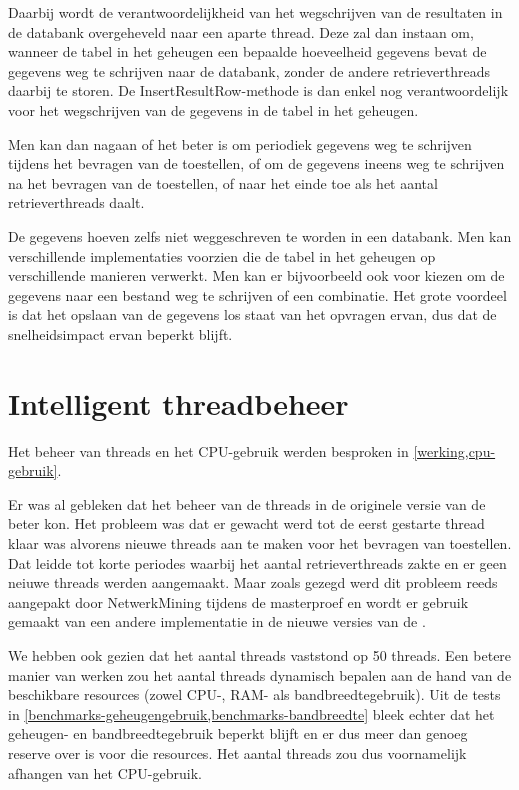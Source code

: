 Daarbij wordt de verantwoordelijkheid van het wegschrijven van de resultaten in de databank overgeheveld naar een aparte thread.
Deze zal dan instaan om, wanneer de tabel in het geheugen een bepaalde hoeveelheid gegevens bevat de gegevens weg te schrijven naar de databank,
zonder de andere retrieverthreads daarbij te storen.
De InsertResultRow-methode is dan enkel nog verantwoordelijk voor het wegschrijven van de gegevens in de tabel in het geheugen.

Men kan dan nagaan of het beter is om periodiek gegevens weg te schrijven tijdens het bevragen van de toestellen,
of om de gegevens ineens weg te schrijven na het bevragen van de toestellen, of naar het einde toe als het aantal retrieverthreads daalt.

De gegevens hoeven zelfs niet weggeschreven te worden in een databank.
Men kan verschillende implementaties voorzien die de tabel in het geheugen op verschillende manieren verwerkt.
Men kan er bijvoorbeeld ook voor kiezen om de gegevens naar een bestand weg te schrijven of een combinatie.
Het grote voordeel is dat het opslaan van de gegevens los staat van het opvragen ervan, dus dat de snelheidsimpact ervan beperkt blijft.


\section{Intelligent threadbeheer}

Het beheer van threads en het CPU-gebruik werden besproken in \cref{werking,cpu-gebruik}.

Er was al gebleken dat het beheer van de threads in de originele versie van de \nwmretriever{} beter kon.
Het probleem was dat er gewacht werd tot de eerst gestarte thread klaar was alvorens nieuwe threads aan te maken voor het bevragen van toestellen.
Dat leidde tot korte periodes waarbij het aantal retrieverthreads zakte en er geen neiuwe threads werden aangemaakt.
Maar zoals gezegd werd dit probleem reeds aangepakt door NetwerkMining tijdens de masterproef en
wordt er gebruik gemaakt van een andere implementatie in de nieuwe versies van de \nwmretriever{}.

We hebben ook gezien dat het aantal threads vaststond op 50 threads.
Een betere manier van werken zou het aantal threads dynamisch bepalen aan de hand van de beschikbare resources (zowel CPU-, RAM- als bandbreedtegebruik).
Uit de tests in \cref{benchmarks-geheugengebruik,benchmarks-bandbreedte} bleek echter dat het geheugen- en bandbreedtegebruik beperkt blijft
en er dus meer dan genoeg reserve over is voor die resources.
Het aantal threads zou dus voornamelijk afhangen van het CPU-gebruik.

